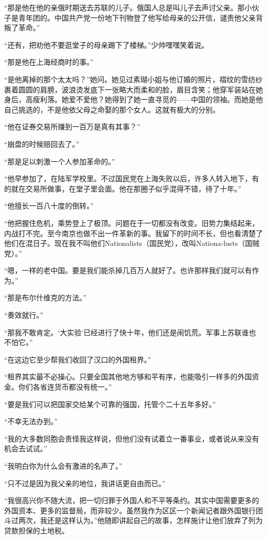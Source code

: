 \par “那是他在他的亲俄时期送去苏联的儿子。俄国人总是叫儿子去声讨父亲。那小伙子是青年团的。中国共产党一份地下刊物登了他写给母亲的公开信，谴责他父亲背叛了革命。”
\par “还有，把劝他不要逛堂子的母亲踢下了楼梯。”少帅嘿嘿笑着说。
\par “那是他在上海经商时的事。”
\par “是他离掉的那个太太吗？”她问。她见过素瑚小姐与他订婚的照片，褶纹的雪纺纱裹着圆圆的肩膀，波浪烫发底下一张略大而柔和的脸，眉目含笑；他穿军装站在她身后，高瘦利落。她爱不爱他？她得到了她一直寻觅的——中国的领袖。而她是他自己挑选的，不是他依父母之命娶的那个女人。这就有极大的分别。
\par “他在证券交易所赚到一百万是真有其事？”
\par “崩盘的时候赔回去了。”
\par “那是足以刺激一个人参加革命的。”
\par “他早参加了，在陆军学校里。不过国民党在上海失败以后，许多人转入地下，有的就在交易所做事，在堂子里会面。他在那圈子似乎混得不错，待了十年。”
\par “他擅长一百八十度的倒转。”
\par “他把握住危机，乘势登上了极顶。问题在于一切都没有改变。旧势力集结起来，内战打不完。至今南京也做不出一件革新的事。我留下的时间不长，但也看清楚了他们在混日子。现在我不叫他们Nationalists（国民党），改叫Nationa-lusts（国贼党）。”
\par “嗯，一样的老中国。要是我们能杀掉几百万人就好了。也许那样我们就可以有作为。”
\par “那是布尔什维克的方法。”
\par “奏效就行。”
\par “那我不敢肯定。‘大实验’已经进行了快十年，他们还是闹饥荒。军事上苏联谁也不怕它。”
\par “在这边它至少帮我们收回了汉口的外国租界。”
\par “租界其实最不必操心。只要全国其他地方够和平有序，也能吸引一样多的外国资金。你们各省连货币都没有统一。”
\par “要是我们可以把国家交给某个可靠的强国，托管个二十五年多好。”
\par “不幸无法办到。”
\par “我的大多数同胞会责怪我这样说，但他们没有试着立一番事业，或者说从来没有机会去试试。”
\par “我明白你为什么会有激进的名声了。”
\par “只不过是因为我父亲的地位，我讲话更自由而已。”
\par “我很高兴你不随大流，把一切归罪于外国人和不平等条约。其实中国需要更多的外国资本、更多的监督局，而非较少。虽然我作为区区一个新闻记者跟外国银行团斗过两次，我还是这样认为。”他随即讲起自己的故事，怎样施计让他们放弃了列为贷款担保的土地税。
